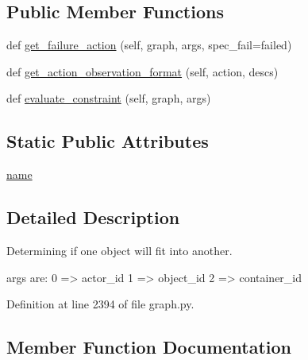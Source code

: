 \subsection*{Public Member Functions}
\begin{DoxyCompactItemize}
\item 
def \hyperlink{classlight__chats_1_1graph_1_1FitsConstraint_a41bb59f13bde75e990d25d86283f3afe}{get\+\_\+failure\+\_\+action} (self, graph, args, spec\+\_\+fail=\textquotesingle{}failed\textquotesingle{})
\item 
def \hyperlink{classlight__chats_1_1graph_1_1FitsConstraint_a1a14b78e6b28a764e7c7833315db2992}{get\+\_\+action\+\_\+observation\+\_\+format} (self, action, descs)
\item 
def \hyperlink{classlight__chats_1_1graph_1_1FitsConstraint_a56a590d425f4c64c228ce3aa03471ffc}{evaluate\+\_\+constraint} (self, graph, args)
\end{DoxyCompactItemize}
\subsection*{Static Public Attributes}
\begin{DoxyCompactItemize}
\item 
\hyperlink{classlight__chats_1_1graph_1_1FitsConstraint_a7de858979fc9366f1099b157151991b5}{name}
\end{DoxyCompactItemize}


\subsection{Detailed Description}
\begin{DoxyVerb}Determining if one object will fit into another.

args are:     0 => actor_id     1 => object_id     2 => container_id
\end{DoxyVerb}
 

Definition at line 2394 of file graph.\+py.



\subsection{Member Function Documentation}
\mbox{\label{classlight__chats_1_1graph_1_1FitsConstraint_a56a590d425f4c64c228ce3aa03471ffc}} 
